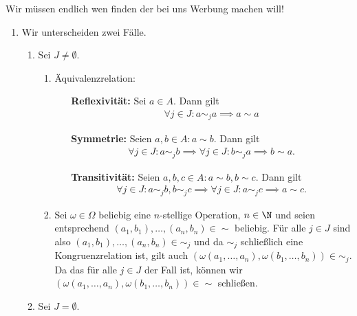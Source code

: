 \begin{solution}
    Wir müssen endlich wen finden der bei uns Werbung machen will!
    \begin{enumerate}[label = \alph*)]
        \item Wir unterscheiden zwei Fälle.
        \begin{enumerate}[label = Fall \arabic*:]
            \item Sei $J \neq \emptyset$.
            \begin{enumerate}[label = (\roman*)]
                \item Äquivalenzrelation: \\
                \begin{itemize}
                  \item [\textbf{Reflexivität:}] Sei $a \in A$. Dann gilt
                  \begin{align*}
                    \forall j \in J: a \sim_j a \implies a \sim a
                  \end{align*}
                  \item [\textbf{Symmetrie:}]
                  Seien $a,b \in A: a \sim b$. Dann gilt
                  \begin{align*}
                    \forall j \in J: a \sim_j b \implies \forall j \in J: b \sim_j a \implies
                    b \sim a.
                  \end{align*}
                  \item [\textbf{Transitivität:}]
                  Seien $a,b,c \in A: a \sim b, b \sim c$. Dann gilt
                  \begin{align*}
                    \forall j \in J: a \sim_j b, b \sim_j c \implies  \forall j \in J: a \sim_j c
                    \implies a \sim c.
                  \end{align*}
              \end{itemize}
                \item Sei $\omega \in \Omega$ beliebig eine $n$-stellige Operation, $n \in \N$ und seien entsprechend $(a_1, b_1), \dots, (a_n, b_n) \in \sim$ beliebig. Für alle $j \in J$ sind also $(a_1, b_1), \dots, (a_n, b_n) \in \sim_j$ und da $\sim_j$ schließlich eine Kongruenzrelation ist, gilt auch $(\omega(a_1, \dots, a_n), \omega(b_1, \dots, b_n)) \in \sim_j$. Da das für alle $j \in J$ der Fall ist, können wir $(\omega(a_1, \dots, a_n), \omega(b_1, \dots, b_n)) \in \sim$ schließen.
            \end{enumerate}
            \item Sei $J = \emptyset$.

\end{enumerate}
\end{enumerate}
\end{solution}
